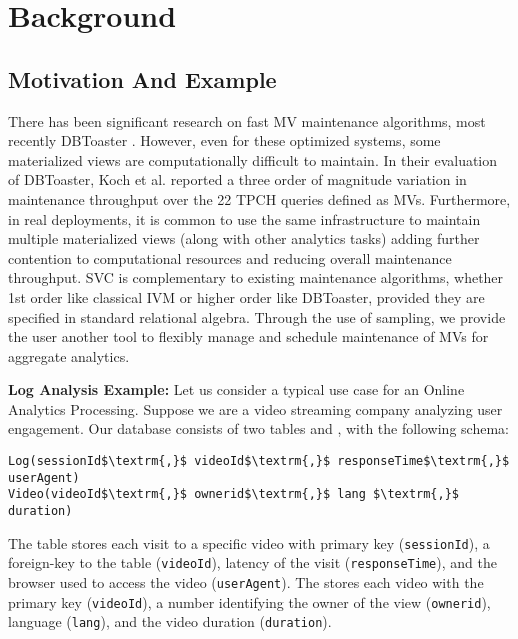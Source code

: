 \section{Background}\label{sec-background}

\subsection{Motivation And Example}\label{subsec-inc}
There has been significant research on fast MV maintenance algorithms, most recently DBToaster \cite{DBLP:journals/vldb/KochAKNNLS14}.
However, even for these optimized systems, some materialized views are computationally difficult to maintain.
In their evaluation of DBToaster, Koch et al. \cite{DBLP:journals/vldb/KochAKNNLS14} reported a three order of magnitude variation in maintenance
throughput over the 22 TPCH queries defined as MVs.
Furthermore, in real deployments, it is common to use the same infrastructure to maintain multiple materialized views (along with other analytics tasks) adding further contention to computational resources and reducing overall maintenance throughput.
SVC is complementary to existing maintenance algorithms, whether 1st order like classical IVM or higher order like DBToaster, provided they are specified in standard relational algebra.
Through the use of sampling, we provide the user another tool to flexibly manage and schedule maintenance of MVs for aggregate analytics.

\vspace{0.25em}

\noindent \textbf{Log Analysis Example: } Let us consider a typical use case for an Online Analytics Processing.
Suppose we are a video streaming company analyzing user engagement.
Our database consists of two tables  and , with the following schema:
\begin{lstlisting}[mathescape,basicstyle={\scriptsize}]
Log(sessionId$\textrm{,}$ videoId$\textrm{,}$ responseTime$\textrm{,}$ userAgent)
Video(videoId$\textrm{,}$ ownerid$\textrm{,}$ lang $\textrm{,}$ duration)
\end{lstlisting}
The  table stores each visit to a specific video with primary key (\texttt{sessionId}), a foreign-key to the  table (\texttt{videoId}), latency of the visit (\texttt{responseTime}), and the browser used to access the video (\texttt{userAgent}).
The  stores each video with the primary key (\texttt{videoId}), a number identifying the owner of the view (\texttt{ownerid}), language (\texttt{lang}), and the video duration (\texttt{duration}).

